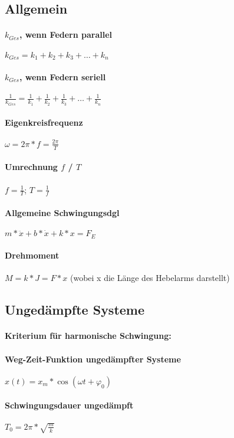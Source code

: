 \documentclass[a4paper, 12pt]{scrreprt}
\begin{document}
\subsection{Allgemein}

\paragraph{\(k_{Ges}\), wenn Federn parallel} \dotfill \(k_{Ges}=k_1+k_2+k_3+ \dots +k_n\)
\paragraph{\(k_{Ges}\), wenn Federn seriell} \dotfill \(\frac{1}{k_{Ges}}=\frac{1}{k_1}+\frac{1}{k_2}+\frac{1}{k_3}+ \dots +\frac{1}{k_n}\)
\paragraph{Eigenkreisfrequenz} \dotfill \(\omega=2\pi*f=\frac{2\pi}{T}\)
\paragraph{Umrechnung \(f\) / \(T\)}\dotfill \(f=\frac{1}{T}\); \(T=\frac{1}{f}\)
\paragraph{Allgemeine Schwingungsdgl} \dotfill \(m* \ddot x + b*\dot x + k *x=F_E\)
\paragraph{Drehmoment} \dotfill \(M = k * J = F * x\) (wobei x die Länge des Hebelarms darstellt)


\subsection{Ungedämpfte Systeme}

\paragraph{Kriterium für harmonische Schwingung: } 
\paragraph{Weg-Zeit-Funktion ungedämpfter Systeme} \dotfill \(x(t)=x_m* \cos(\omega t + \varphi_0)\)
\paragraph{Schwingungsdauer ungedämpft} \dotfill \(T_0=2\pi*\sqrt{\frac{m}{k}}\)
\end{document}
